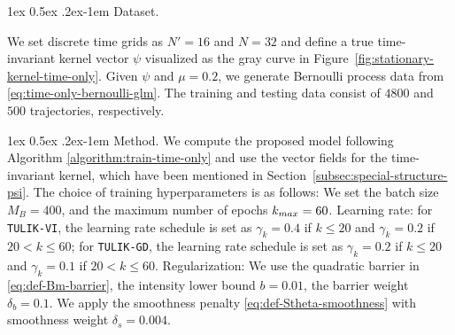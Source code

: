 \documentclass[11pt]{article}
\makeatletter
\newcommand{\xc}[1]{\textcolor{orange}{\textsf{XC: #1}}}
\theoremstyle{remark}
\theoremstyle{plain}
\renewcommand{\paragraph}{%
  \@startsection{paragraph}{4}%
  {\z@}{1ex \@plus 0.5ex \@minus .2ex}{-1em}%
  {\normalfont\normalsize\itshape}%
}
\makeatother
\begin{document}
\paragraph{Dataset.} 


We set discrete time grids as $N'=16$ and $N=32$ and define a true time-invariant kernel vector $\psi$ visualized as the gray curve in Figure~\ref{fig:stationary-kernel-time-only}. Given $\psi$ and $\mu=0.2$, we generate Bernoulli process data from \eqref{eq:time-only-bernoulli-glm}. The training and testing data consist of $4800$ and $500$ trajectories, respectively.
 


\paragraph{Method.}
We compute the proposed model following Algorithm \ref{algorithm:train-time-only} and use the vector fields for the time-invariant kernel, which have been mentioned in Section~\ref{subsec:special-structure-psi}.
The choice of training hyperparameters is as follows:
We set the batch size $M_B=400$, and the maximum number of epochs $k_{\rm max} = 60$. 
%
Learning rate: for \texttt{TULIK-VI}, the learning rate schedule is set as $\gamma_k = 0.4$ if $k\le 20$ and $\gamma_k = 0.2$ if $20 <k\le 60$; for \texttt{TULIK-GD}, the learning rate schedule is set as $\gamma_k = 0.2$ if $k\le 20$ and $\gamma_k = 0.1$ if $20 <k\le 60$.
%
Regularization: We use the quadratic barrier in \eqref{eq:def-Bm-barrier}, the intensity lower bound $b=0.01$, the barrier weight $\delta_b=0.1$.  We apply the smoothness penalty \eqref{eq:def-Stheta-smoothness}
with smoothness weight $\delta_s = 0.004$. 
\end{document}
